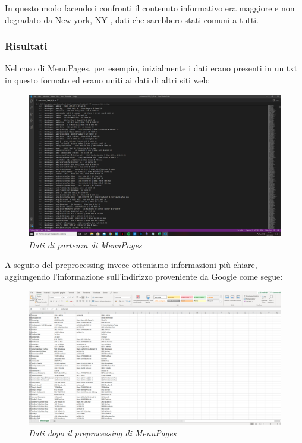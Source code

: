 \documentclass[a4paper,12pt]{article}
\begin{document}
\noindent In questo modo facendo i confronti il contenuto informativo era maggiore e non degradato da New york, NY , dati che sarebbero stati comuni a tutti.

\subsubsection{Risultati}
Nel caso di MenuPages, per esempio, inizialmente i dati erano presenti in un txt in questo formato ed erano uniti ai dati di altri siti web:\\
\begin{figure}[H]
\centering
\includegraphics[width=0.9\linewidth]{img/original.png}
\caption{\textit{Dati di partenza di MenuPages}}
\end{figure}

\noindent A seguito del preprocessing invece otteniamo informazioni più chiare, aggiungendo l'informazione sull'indirizzo proveniente da Google come segue:\\

\begin{figure}[H]
\centering
\includegraphics[width=0.9\linewidth]{img/new.png}
\caption{\textit{Dati dopo il preprocessing di MenuPages}}
\end{figure}
\end{document}
